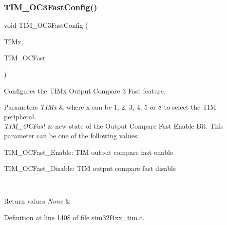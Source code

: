\mbox{\label{group___t_i_m_gab2f3698e6e56bd9b0a4be7056ba789e1}} 
\subsubsection{\texorpdfstring{T\+I\+M\+\_\+\+O\+C3\+Fast\+Config()}{TIM\_OC3FastConfig()}}
{\footnotesize\ttfamily void T\+I\+M\+\_\+\+O\+C3\+Fast\+Config (\begin{DoxyParamCaption}\item[{\hyperlink{struct_t_i_m___type_def}{T\+I\+M\+\_\+\+Type\+Def} $\ast$}]{T\+I\+Mx,  }\item[{uint16\+\_\+t}]{T\+I\+M\+\_\+\+O\+C\+Fast }\end{DoxyParamCaption})}



Configures the T\+I\+Mx Output Compare 3 Fast feature. 


\begin{DoxyParams}{Parameters}
{\em T\+I\+Mx} & where x can be 1, 2, 3, 4, 5 or 8 to select the T\+IM peripheral. \\
\hline
{\em T\+I\+M\+\_\+\+O\+C\+Fast} & new state of the Output Compare Fast Enable Bit. This parameter can be one of the following values\+: \begin{DoxyItemize}
\item T\+I\+M\+\_\+\+O\+C\+Fast\+\_\+\+Enable\+: T\+IM output compare fast enable \item T\+I\+M\+\_\+\+O\+C\+Fast\+\_\+\+Disable\+: T\+IM output compare fast disable \end{DoxyItemize}
\\
\hline
\end{DoxyParams}

\begin{DoxyRetVals}{Return values}
{\em None} & \\
\hline
\end{DoxyRetVals}


Definition at line 1408 of file stm32f4xx\+\_\+tim.\+c.

\mbox{\label{group___t_i_m_ga90d4a358d4e6d4c5ed17dc1d6beb5f30}} 
